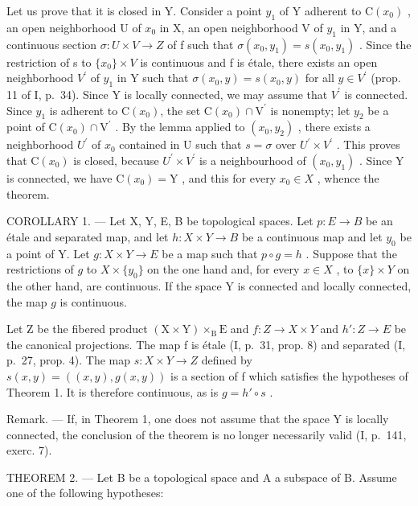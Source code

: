 Let us prove that it is closed in Y. Consider a point \(y_{1}\) of Y adherent to \(\mathrm{C}(x_{0})\) , an open neighborhood U of \(x_{0}\) in X, an open neighborhood V of \(y_{1}\) in Y, and a continuous section \(\sigma\colon U\times V\to Z\) of f such that \(\sigma(x_{0},y_{1})=s(x_{0},y_{1})\) . Since the restriction of s to \(\{x_{0}\}\times V\) is continuous and f is étale, there exists an open neighborhood \(V^{\prime}\) of \(y_{1}\) in Y such that \(\sigma(x_{0},y)=s(x_{0},y)\) for all \(y\in V^{\prime}\) (prop. 11 of I, p.~34). Since Y is locally connected, we may assume that \(V^{\prime}\) is connected. Since \(y_{1}\) is adherent to \(\mathrm{C}(x_{0})\), the set \(\mathrm{C}(x_{0})\cap\mathrm{V}^{\prime}\) is nonempty; let \(y_{2}\) be a point of \(\mathrm{C}(x_{0})\cap\mathrm{V}^{\prime}\) . By the lemma applied to \((x_{0},y_{2})\) , there exists a neighborhood \(U^{\prime}\) of \(x_{0}\) contained in U such that \(s=\sigma\) over \(U^{\prime} \times V^{\prime}\) . This proves that \(\mathrm{C}(x_{0})\) is closed, because \(U^{\prime} \times V^{\prime}\) is a neighbourhood of \((x_{0}, y_{1})\) . Since Y is connected, we have \(\mathrm{C}(x_{0}) = \mathrm{Y}\) , and this for every \(x_{0} \in X\) , whence the theorem.

COROLLARY 1. --- Let X, Y, E, B be topological spaces. Let \(p\colon E \to B\) be an étale and separated map, and let \(h\colon X \times Y \to B\) be a continuous map and let \(y_0\) be a point of Y. Let \(g\colon X \times Y \to E\) be a map such that \(p \circ g = h\) . Suppose that the restrictions of \(g\) to \(X \times \{y_0\}\) on the one hand and, for every \(x \in X\) , to \(\{x\} \times Y\) on the other hand, are continuous. If the space Y is connected and locally connected, the map \(g\) is continuous.

Let Z be the fibered product \((\mathrm{X} \times \mathrm{Y}) \times_{\mathrm{B}} \mathrm{E}\) and \(f: Z \to X \times Y\) and \(h': Z \to E\) be the canonical projections. The map f is étale (I, p.~31, prop. 8) and separated (I, p.~27, prop. 4). The map \(s: X \times Y \to Z\) defined by \(s(x, y) = ((x, y), g(x, y))\) is a section of f which satisfies the hypotheses of Theorem 1. It is therefore continuous, as is \(g = h' \circ s\) .

Remark. --- If, in Theorem 1, one does not assume that the space Y is locally connected, the conclusion of the theorem is no longer necessarily valid (I, p.~141, exerc. 7).

THEOREM 2. --- Let B be a topological space and A a subspace of B. Assume one of the following hypotheses:

